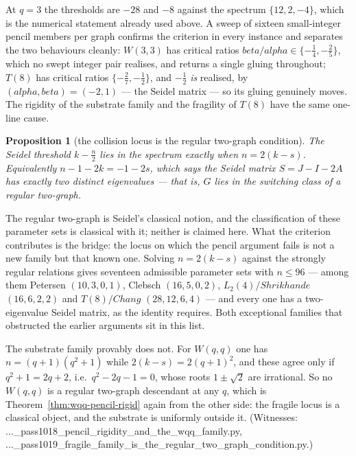 \documentclass[12pt,a4paper]{article}
\def\mathcal#1{#1}%
\def\texttt#1{#1}%
\def\text#1{#1}%
\def\alpha{alpha}%
\def\beta{beta}%
\newtheorem{proposition}[theorem]{Proposition}
\theoremstyle{definition}
\begin{document}
At $q=3$ the thresholds are $-28$ and $-8$ against the spectrum $\{12,2,-4\}$,
which is the numerical statement already used above. A sweep of sixteen
small-integer pencil members per graph confirms the criterion in every instance
and separates the two behaviours cleanly: $W(3,3)$ has critical ratios
$\beta/\alpha \in \{-\tfrac14,-\tfrac25\}$, which no swept integer pair
realises, and returns a single gluing throughout; $T(8)$ has critical ratios
$\{-\tfrac27,-\tfrac12\}$, and $-\tfrac12$ \emph{is} realised, by
$(\alpha,\beta)=(-2,1)$ --- the Seidel matrix --- so its gluing genuinely moves.
The rigidity of the substrate family and the fragility of $T(8)$ have the same
one-line cause.

\begin{proposition}[the collision locus is the regular two-graph condition]
\label{prop:collision-two-graph}
The Seidel threshold $k-\tfrac n2$ lies in the spectrum exactly when
$n = 2(k-s)$. Equivalently $n-1-2k = -1-2s$, which says the Seidel matrix
$\mathcal S = J-I-2A$ has exactly two distinct eigenvalues --- that is, $G$ lies
in the switching class of a \emph{regular two-graph}.
\end{proposition}

The regular two-graph is Seidel's classical notion, and the classification of
these parameter sets is classical with it; neither is claimed here. What the
criterion contributes is the bridge: the locus on which the pencil argument
fails is not a new family but that known one. Solving $n=2(k-s)$ against the
strongly regular relations gives seventeen admissible parameter sets with
$n\le 96$ --- among them Petersen $(10,3,0,1)$, Clebsch $(16,5,0,2)$,
$L_2(4)/\text{Shrikhande}$ $(16,6,2,2)$ and $T(8)/\text{Chang}$ $(28,12,6,4)$ ---
and every one has a two-eigenvalue Seidel matrix, as the identity requires. Both
exceptional families that obstructed the earlier arguments sit in this list.

The substrate family provably does not. For $W(q,q)$ one has
$n=(q+1)(q^2+1)$ while $2(k-s)=2(q+1)^2$, and these agree only if
$q^2+1 = 2q+2$, i.e.\ $q^2-2q-1=0$, whose roots $1\pm\sqrt2$ are irrational. So
no $W(q,q)$ is a regular two-graph descendant at any $q$, which is
Theorem~\ref{thm:wqq-pencil-rigid} again from the other side: the fragile locus
is a classical object, and the substrate is uniformly outside it.
(Witnesses:
\texttt{...\_pass1018\_pencil\_rigidity\_and\_the\_wqq\_family.py},
\texttt{...\_pass1019\_fragile\_family\_is\_the\_regular\_two\_graph\_condition.py}.)
\end{document}
